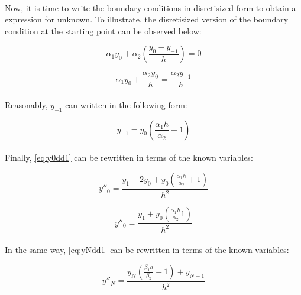\documentclass[letterpaper,12pt]{article}
\begin{document}
\paragraph{} Now, it is time to write the boundary conditions in disretisized form to obtain a expression for unknown. To illustrate, the disretisized version of the boundary condition at the starting point can be observed below:

\begin{equation*}
    \alpha_1 y_0 + \alpha_2 \left(\frac{y_0 - y_{-1}}{h}\right) = 0
\end{equation*}

\begin{equation*}
    \alpha_1 y_0 + \frac{\alpha_2 y_0}{h} = \frac{\alpha_2 y_{-1}}{h}
\end{equation*}

\paragraph{} Reasonably, $y_{-1}$ can written in the following form:

\begin{equation*}
    y_{-1} = y_0 \left(\frac{\alpha_1h}{\alpha_2} + 1\right)
\end{equation*}

\paragraph{} Finally, \eqref{eq:y0dd1} can be rewritten in terms of the known variables:

\begin{equation*}
    y''_0 = \frac{ y_1 - 2y_0 +  y_0 \left(\frac{\alpha_1h}{\alpha_2} + 1\right)}{h^2}
\end{equation*}

\begin{equation*}
    y''_0 = \frac{ y_1 +  y_0 \left(\frac{\alpha_1h}{\alpha_2}  1\right)}{h^2}
\end{equation*}

\paragraph{} In the same way, \eqref{eq:yNdd1} can be rewritten in terms of the known variables:

\begin{equation*}
    y''_N = \frac{y_N \left(\frac{\beta_1h}{\beta_2} - 1\right)+y_{N-1}}{h^2}
\end{equation*}
\end{document}
